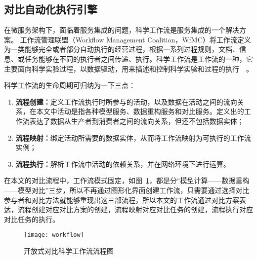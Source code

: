 \subsection{对比自动化执行引擎}
在微服务架构下，面临着服务集成的问题，科学工作流是服务集成的一个解决方案。 %
工作流管理联盟（Workflow Management Coalition，WfMC）将工作流定义为一类能够完全或者部分自动执行的经营过程，根据一系列过程规则，文档、信息、或任务能够在不同的执行者之间传递、执行。科学工作流是工作流的一种，它主要面向科学实验过程，以数据驱动，用来描述和控制科学实验和过程的执行~\cite{ludascher2006scientific}~\cite{Zhao2009Special}。

科学工作流的生命周期可归纳为一下三点：
\begin{enumerate}[(1)]
    \item \textbf{流程创建：}定义工作流执行时所参与的活动，以及数据在活动之间的流向关系，在本文中活动是指各种模型服务、数据重构服务和对比服务。定义出的工作流表达了数据从生产者到消费者之间的流向关系，但还不包括数据实体；
    \item \textbf{流程映射：}绑定活动所需要的数据实体，从而将工作流映射为可执行的工作流实例；
    \item \textbf{流程执行：}解析工作流中活动的依赖关系，并在网络环境下进行运算。
\end{enumerate}

在本文的对比流程中，工作流模式固定，如图~\ref{fig:workflow}，都是分“模型计算——数据重构——模型对比”三步，所以不再通过图形化界面创建工作流，只需要通过选择对比参与者和对比方法就能够重现出这三部流程，所以本文的工作流通过对比方案表达，流程创建对应对比方案的创建，流程映射对应对比任务的创建，流程执行对应对比任务的执行。


\begin{figure}[!htbp]
    \centering
    \texttt{[image: workflow]}
    \caption{开放式对比科学工作流流程图}
    \label{fig:workflow}
\end{figure}

